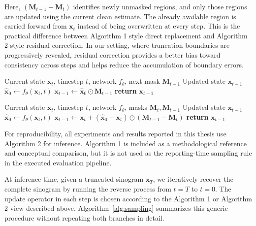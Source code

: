 Here, $(\mathbf{M}_{t-1} - \mathbf{M}_t)$ identifies newly unmasked regions, and only those regions are updated using the current clean estimate. The already available region is carried forward from $\mathbf{x}_t$ instead of being overwritten at every step. This is the practical difference between Algorithm 1 style direct replacement and Algorithm 2 style residual correction. In our setting, where truncation boundaries are progressively revealed, residual correction provides a better bias toward consistency across steps and helps reduce the accumulation of boundary errors.

\begin{algorithm}[htbp]
\caption{Algorithm 1 Style Reverse Update (Direct Replacement)}
\label{alg:algo1_update}
\begin{algorithmic}[1]
\REQUIRE Current state $\mathbf{x}_t$, timestep $t$, network $f_\theta$, next mask $\mathbf{M}_{t-1}$
\ENSURE Updated state $\mathbf{x}_{t-1}$
\STATE $\hat{\mathbf{x}}_0 \gets f_\theta(\mathbf{x}_t, t)$
\STATE $\mathbf{x}_{t-1} \gets \hat{\mathbf{x}}_0 \odot \mathbf{M}_{t-1}$
\STATE \textbf{return} $\mathbf{x}_{t-1}$
\end{algorithmic}
\end{algorithm}

\begin{algorithm}[htbp]
\caption{Algorithm 2 Style Reverse Update (Residual Correction)}
\label{alg:algo2_update}
\begin{algorithmic}[1]
\REQUIRE Current state $\mathbf{x}_t$, timestep $t$, network $f_\theta$, masks $\mathbf{M}_{t}, \mathbf{M}_{t-1}$
\ENSURE Updated state $\mathbf{x}_{t-1}$
\STATE $\hat{\mathbf{x}}_0 \gets f_\theta(\mathbf{x}_t, t)$
\STATE $\mathbf{x}_{t-1} \gets \mathbf{x}_t + (\hat{\mathbf{x}}_0 - \mathbf{x}_t) \odot (\mathbf{M}_{t-1} - \mathbf{M}_t)$
\STATE \textbf{return} $\mathbf{x}_{t-1}$
\end{algorithmic}
\end{algorithm}

For reproducibility, all experiments and results reported in this thesis use Algorithm 2 for inference. Algorithm 1 is included as a methodological reference and conceptual comparison, but it is not used as the reporting-time sampling rule in the executed evaluation pipeline.

At inference time, given a truncated sinogram $\mathbf{x}_T$, we iteratively recover the complete sinogram by running the reverse process from $t=T$ to $t=0$. The update operator in each step is chosen according to the Algorithm 1 or Algorithm 2 view described above. Algorithm~\ref{alg:sampling} summarizes this generic procedure without repeating both branches in detail.

